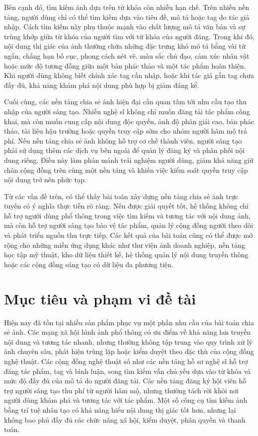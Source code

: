 Bên cạnh đó, tìm kiếm ảnh dựa trên từ khóa còn nhiều hạn chế. Trên nhiều nền tảng, người dùng chỉ có thể tìm kiếm dựa vào tiêu đề, mô tả hoặc tag do tác giả nhập. Cách tìm kiếm này phụ thuộc mạnh vào chất lượng mô tả văn bản và sự trùng khớp giữa từ khóa của người tìm với từ khóa của người đăng. Trong khi đó, nội dung thị giác của ảnh thường chứa những đặc trưng khó mô tả bằng vài từ ngắn, chẳng hạn bố cục, phong cách nét vẽ, màu sắc chủ đạo, cảm xúc nhân vật hoặc mức độ tương đồng giữa một bản phác thảo và một tác phẩm hoàn thiện. Khi người dùng không biết chính xác tag cần nhập, hoặc khi tác giả gắn tag chưa đầy đủ, khả năng khám phá nội dung phù hợp bị giảm đáng kể.

Cuối cùng, các nền tảng chia sẻ ảnh hiện đại cần quan tâm tới nhu cầu tạo thu nhập của người sáng tạo. Nhiều nghệ sĩ không chỉ muốn đăng tải tác phẩm công khai, mà còn muốn cung cấp nội dung độc quyền, ảnh độ phân giải cao, bản phác thảo, tài liệu hậu trường hoặc quyền truy cập sớm cho nhóm người hâm mộ trả phí. Nếu nền tảng chia sẻ ảnh không hỗ trợ cơ chế thành viên, người sáng tạo phải sử dụng thêm các dịch vụ bên ngoài để quản lý đăng ký và phân phối nội dung riêng. Điều này làm phân mảnh trải nghiệm người dùng, giảm khả năng giữ chân cộng đồng trên cùng một nền tảng và khiến việc kiểm soát quyền truy cập nội dung trở nên phức tạp.

Từ các vấn đề trên, có thể thấy bài toán xây dựng nền tảng chia sẻ ảnh trực tuyến có ý nghĩa thực tiễn rõ ràng. Nếu được giải quyết tốt, hệ thống không chỉ hỗ trợ người dùng phổ thông trong việc tìm kiếm và tương tác với nội dung ảnh, mà còn hỗ trợ người sáng tạo bảo vệ tác phẩm, quản lý cộng đồng người theo dõi và phát triển nguồn thu trực tiếp. Các kết quả của bài toán cũng có thể được mở rộng cho những miền ứng dụng khác như thư viện ảnh doanh nghiệp, nền tảng học tập mỹ thuật, kho dữ liệu thiết kế, hệ thống quản lý nội dung truyền thông hoặc các cộng đồng sáng tạo có dữ liệu đa phương tiện.

\section{Mục tiêu và phạm vi đề tài}

Hiện nay đã tồn tại nhiều sản phẩm phục vụ một phần nhu cầu của bài toán chia sẻ ảnh. Các mạng xã hội hình ảnh phổ thông có ưu điểm về khả năng lan truyền nội dung và tương tác nhanh, nhưng thường không tập trung vào quy trình xử lý ảnh chuyên sâu, phát hiện trùng lặp hoặc kiểm duyệt theo đặc thù của cộng đồng nghệ thuật. Các cộng đồng nghệ thuật số như các nền tảng hồ sơ nghệ sĩ hỗ trợ đăng tác phẩm, tag và bình luận, song tìm kiếm vẫn chủ yếu dựa vào từ khóa và mức độ đầy đủ của mô tả do người đăng tải. Các nền tảng đăng ký hội viên hỗ trợ người sáng tạo thu phí từ người hâm mộ, nhưng thường tách rời khỏi nơi người dùng khám phá và tương tác với tác phẩm. Một số công cụ tìm kiếm ảnh bằng trí tuệ nhân tạo có khả năng hiểu nội dung thị giác tốt hơn, nhưng lại không bao phủ đầy đủ các chức năng xã hội, kiểm duyệt, phân quyền và thanh toán.

